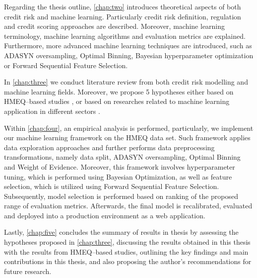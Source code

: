 Regarding the thesis outline, \autoref{chap:two} introduces theoretical aspects of both credit risk  and machine learning. Particularly credit risk definition, regulation and credit scoring approaches are described. Moreover, machine learning terminology, machine learning algorithms and evaluation metrics are explained.
Furthermore, more advanced machine learning techniques are introduced, such as ADASYN oversampling, Optimal Binning, Bayesian hyperparameter optimization or Forward Sequential Feature Selection.

In \autoref{chap:three} we conduct literature review from both credit risk modelling and machine learning fields. Moreover, we propose 5 hypotheses either based on HMEQ--based studies \citep{serkan2021bagging, zurada2014classification}, or based on researches related to machine learning application in different sectors \citep{de2023predicting, pintelas2020grey, wu2018accurate}.

Within \autoref{chap:four}, an empirical analysis is performed, particularly, we implement our machine learning framework on the HMEQ data set.
Such framework applies data exploration approaches and further performs data preprocessing transformations, namely data split, ADASYN oversampling, Optimal Binning and Weight of Evidence.
Moreover, this framework involves hyperparameter tuning, which is performed using Bayesian Optimization, as well as feature selection, which is utilized using Forward Sequential Feature Selection.
Subsequently, model selection is performed based on ranking of the proposed range of evaluation metrics.
Afterwards, the final model is recalibrated, evaluated and deployed into a production environment as a web application.

Lastly, \autoref{chap:five} concludes the summary of results in thesis by assessing the hypotheses proposed in \autoref{chap:three}, discussing the results obtained in this thesis with the results from HMEQ--based studies, outlining the key findings and main contributions in this thesis, and also proposing the author's recommendations for future research. 
